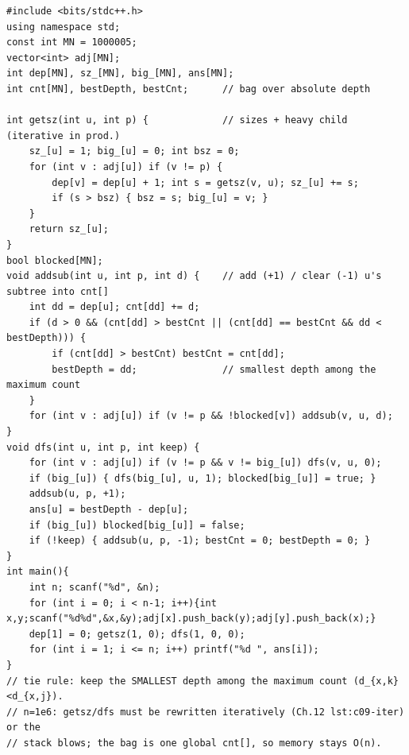 \begin{lstlisting}[caption={CF 1009F: sack over absolute-depth buckets, tie -> smallest distance}, label={lst:c28-summit}]
#include <bits/stdc++.h>
using namespace std;
const int MN = 1000005;
vector<int> adj[MN];
int dep[MN], sz_[MN], big_[MN], ans[MN];
int cnt[MN], bestDepth, bestCnt;      // bag over absolute depth

int getsz(int u, int p) {             // sizes + heavy child (iterative in prod.)
    sz_[u] = 1; big_[u] = 0; int bsz = 0;
    for (int v : adj[u]) if (v != p) {
        dep[v] = dep[u] + 1; int s = getsz(v, u); sz_[u] += s;
        if (s > bsz) { bsz = s; big_[u] = v; }
    }
    return sz_[u];
}
bool blocked[MN];
void addsub(int u, int p, int d) {    // add (+1) / clear (-1) u's subtree into cnt[]
    int dd = dep[u]; cnt[dd] += d;
    if (d > 0 && (cnt[dd] > bestCnt || (cnt[dd] == bestCnt && dd < bestDepth))) {
        if (cnt[dd] > bestCnt) bestCnt = cnt[dd];
        bestDepth = dd;               // smallest depth among the maximum count
    }
    for (int v : adj[u]) if (v != p && !blocked[v]) addsub(v, u, d);
}
void dfs(int u, int p, int keep) {
    for (int v : adj[u]) if (v != p && v != big_[u]) dfs(v, u, 0);
    if (big_[u]) { dfs(big_[u], u, 1); blocked[big_[u]] = true; }
    addsub(u, p, +1);
    ans[u] = bestDepth - dep[u];
    if (big_[u]) blocked[big_[u]] = false;
    if (!keep) { addsub(u, p, -1); bestCnt = 0; bestDepth = 0; }
}
int main(){
    int n; scanf("%d", &n);
    for (int i = 0; i < n-1; i++){int x,y;scanf("%d%d",&x,&y);adj[x].push_back(y);adj[y].push_back(x);}
    dep[1] = 0; getsz(1, 0); dfs(1, 0, 0);
    for (int i = 1; i <= n; i++) printf("%d ", ans[i]);
}
// tie rule: keep the SMALLEST depth among the maximum count (d_{x,k}<d_{x,j}).
// n=1e6: getsz/dfs must be rewritten iteratively (Ch.12 lst:c09-iter) or the
// stack blows; the bag is one global cnt[], so memory stays O(n).
\end{lstlisting}

